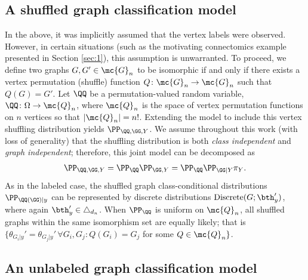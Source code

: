 \documentclass[10pt,journal,cspaper,compsoc]{IEEEtran}
\newcommand{\Qs}{Q}
\begin{document}

\subsection{A shuffled graph classification model} %
\label{sub:a_shuffled_graph_classification_model}


In the above, it was implicitly assumed that the vertex labels were observed.  However, in certain situations (such as the motivating connectomics example presented in Section \ref{sec:1}), this assumption is unwarranted.  To proceed, we define two graphs $G,G' \in \mc{G}_n$ to be isomorphic if and only if there exists a vertex permutation (shuffle) function $\Qs\colon\mc{G}_n \to \mc{G}_n$ such that $\Qs(G)=G'$.  Let $\QQ$ be a permutation-valued random variable, $\QQ\colon\Omega \to \mc{Q}_n$, where $\mc{Q}_n$ is the space of vertex permutation functions on $n$ vertices so that $|\mc{Q}_n|=n!$.  Extending the model to include this vertex shuffling distribution yields $\PP_{\QQ,\GG,Y}$.  We assume throughout this work (with loss of generality) that the shuffling distribution is both \emph{class independent} and \emph{graph independent}; therefore, this joint model can be decomposed as
\begin{align}
	\PP_{\QQ,\GG,Y} = \PP_{\QQ} \PP_{\GG,Y} = \PP_{\QQ} \PP_{\GG |Y} \pi_Y.
\end{align}
As in the labeled case, the shuffled graph class-conditional distributions $\PP_{\QQ(\GG)|y}$ can be represented by discrete distributions $\text{Discrete}(G; \bth_y')$, where again $\bth_y' \in \triangle_{d_n}$.  When $\PP_{\QQ}$ is uniform on $\mc{Q}_n$, all shuffled graphs within the same isomorphism set are equally likely; that is  $\{\theta_{G_i|y}' = \theta_{G_j|y}' \, \forall G_i,G_j \colon \Qs(G_i)=G_j$ for some $\Qs \in \mc{Q}_n\}$.


\subsection{An unlabeled graph classification model} %
\label{sub:an_unlabeled_graph_classification_model}

\end{document}
